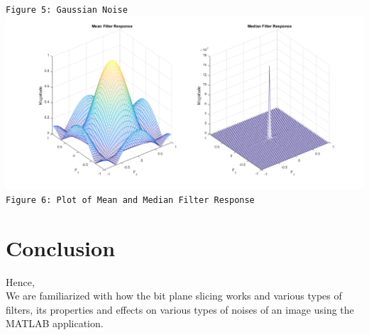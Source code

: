 \documentclass[12pt]{article}
\begin{document}
\texttt{Figure 5:  Gaussian Noise}\\
\includegraphics[scale = 0.5]{output_labsix_4.png}\\
\texttt{Figure 6:  Plot of Mean and Median Filter Response}\\

\pagebreak
\section{Conclusion}
Hence, \\
We are familiarized with how the bit plane slicing works and various types of filters, its properties and effects on various types of noises of an image using the MATLAB application.
\end{document}
